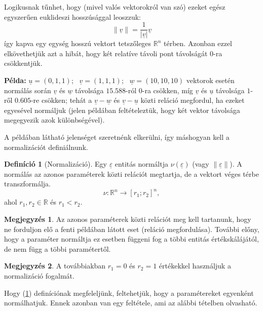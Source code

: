 \documentclass[twocolumn]{article}
\theoremstyle{definition}
\newtheorem{definition}{Definíció}[section]
\newtheorem*{megj}{Megjegyzés}
\newcommand{\vect}[1]{ \underline{#1} }
\newcommand{\norm}[1]{ \parallel {#1} \parallel }
\newcommand{\pl}{ \textbf{Példa:} }
\begin{document}
    Logikusnak tűnhet, hogy (mivel valós vektorokról van szó) ezeket egész egyszerűen euklideszi hosszúsággal leoszzuk:
    $$ \parallel\vect{v}\parallel = \frac{1}{|\vect{v}|} \vect{v} $$
    így kapva egy egység hosszú vektort tetszőleges $\mathbb{R}^n$ térben. Azonban ezzel elkövethetjük azt a hibát, hogy két relatíve távoli pont távolságát 0-ra csökkentjük.
    
    \pl $\vect u = (0, 1, 1)$; \ $\vect v = (1, 1, 1)$; \ $\vect w = (10, 10, 10)$
    vektorok esetén normálás során $\vect v$ és $\vect w$ távolsága $15.588$-ról $0$-ra csökken, míg $\vect v$ és $\vect u$ távolsága $1$-ről $0.605$-re csökken; tehát a $\vect v - \vect w$ és $\vect v - \vect u$ közti reláció megfordul, ha ezeket egyesével normáljuk (jelen példában feltételeztük, hogy két vektor távolsága megegyezik azok különbségével).
    
    A példában látható jelenséget szeretnénk elkerülni, így máshogyan kell a normalizációt definiálnunk.
    
    \begin{definition}[Normalizáció]\label{def:norm}
        Egy $\vect\varepsilon$ entitás normáltja $\nu(\vect\varepsilon)$ (vagy $\norm{\vect\varepsilon}$). A normálás az azonos paraméterek közti relációt megtartja, de a vektort véges térbe transzformálja.
        \begin{equation}
            \nu : \mathbb{R}^n \to [r_1; r_2]^n,
        \end{equation}
        ahol $r_1, r_2 \in \mathbb{R}$ és $r_1 < r_2$.
        
        \begin{megj}
            Az azonos paraméterek közti relációt meg kell tartanunk, hogy ne forduljon elő a fenti példában látott eset (reláció megfordulása). További előny, hogy a paraméter normáltja ez esetben függeni fog a többi entitás értékskálájától, de nem függ a többi paramétertől.
        \end{megj}
        
        \begin{megj}
            A továbbiakban $r_1 = 0$ és $r_2 = 1$ értékekkel használjuk a normalizáció fogalmát.
        \end{megj}
    \end{definition}
    
    Hogy \az (\ref{def:norm}) definíciónak megfeleljünk, feltehetjük, hogy a paramétereket egyenként normálhatjuk. Ennek azonban van egy feltétele, ami az alábbi tételben olvasható.
    
\end{document}
